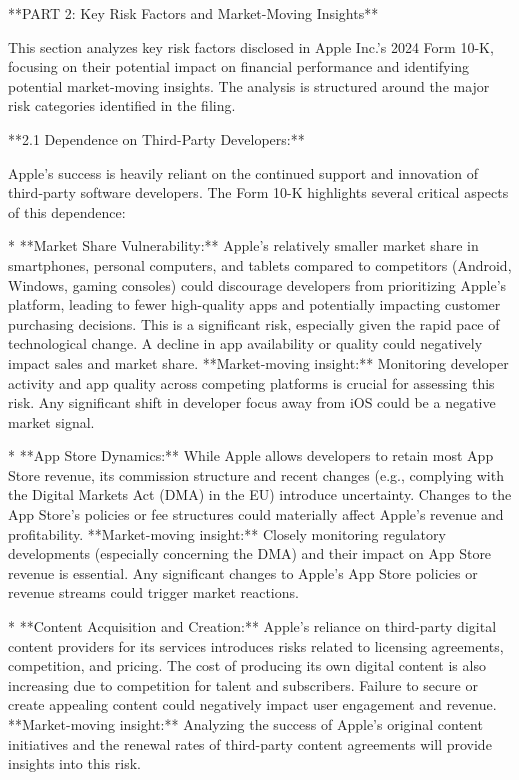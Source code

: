 {{**PART 2: Key Risk Factors and Market-Moving Insights**

This section analyzes key risk factors disclosed in Apple Inc.'s 2024 Form 10-K, focusing on their potential impact on financial performance and identifying potential market-moving insights.  The analysis is structured around the major risk categories identified in the filing.

**2.1 Dependence on Third-Party Developers:**

Apple's success is heavily reliant on the continued support and innovation of third-party software developers.  The Form 10-K highlights several critical aspects of this dependence:

* **Market Share Vulnerability:** Apple's relatively smaller market share in smartphones, personal computers, and tablets compared to competitors (Android, Windows, gaming consoles) could discourage developers from prioritizing Apple's platform, leading to fewer high-quality apps and potentially impacting customer purchasing decisions.  This is a significant risk, especially given the rapid pace of technological change.  A decline in app availability or quality could negatively impact sales and market share.  **Market-moving insight:**  Monitoring developer activity and app quality across competing platforms is crucial for assessing this risk.  Any significant shift in developer focus away from iOS could be a negative market signal.

* **App Store Dynamics:** While Apple allows developers to retain most App Store revenue, its commission structure and recent changes (e.g., complying with the Digital Markets Act (DMA) in the EU) introduce uncertainty.  Changes to the App Store's policies or fee structures could materially affect Apple's revenue and profitability.  **Market-moving insight:**  Closely monitoring regulatory developments (especially concerning the DMA) and their impact on App Store revenue is essential.  Any significant changes to Apple's App Store policies or revenue streams could trigger market reactions.

* **Content Acquisition and Creation:** Apple's reliance on third-party digital content providers for its services introduces risks related to licensing agreements, competition, and pricing.  The cost of producing its own digital content is also increasing due to competition for talent and subscribers.  Failure to secure or create appealing content could negatively impact user engagement and revenue.  **Market-moving insight:**  Analyzing the success of Apple's original content initiatives and the renewal rates of third-party content agreements will provide insights into this risk.

}}
